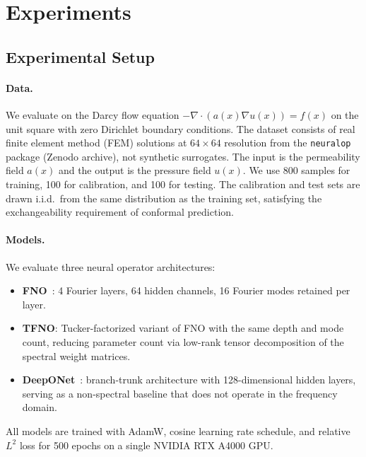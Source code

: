 
\section{Experiments}
\label{sec:experiments}

\subsection{Experimental Setup}
\label{subsec:setup}

\paragraph{Data.}
We evaluate on the Darcy flow equation $-\nabla \cdot (a(x)\nabla u(x)) = f(x)$ on the unit square with zero Dirichlet boundary conditions. The dataset consists of real finite element method (FEM) solutions at $64 \times 64$ resolution from the \texttt{neuralop} package (Zenodo archive), not synthetic surrogates. The input is the permeability field $a(x)$ and the output is the pressure field $u(x)$. We use 800 samples for training, 100 for calibration, and 100 for testing. The calibration and test sets are drawn i.i.d.\ from the same distribution as the training set, satisfying the exchangeability requirement of conformal prediction.

\paragraph{Models.}
We evaluate three neural operator architectures:
\begin{itemize}[leftmargin=*,itemsep=2pt,topsep=2pt]
  \item \textbf{FNO}~\citep{li2021fourier}: 4 Fourier layers, 64 hidden channels, 16 Fourier modes retained per layer.
  \item \textbf{TFNO}: Tucker-factorized variant of FNO with the same depth and mode count, reducing parameter count via low-rank tensor decomposition of the spectral weight matrices.
  \item \textbf{DeepONet}~\citep{lu2021learning}: branch-trunk architecture with 128-dimensional hidden layers, serving as a non-spectral baseline that does not operate in the frequency domain.
\end{itemize}
All models are trained with AdamW, cosine learning rate schedule, and relative $L^2$ loss for 500 epochs on a single NVIDIA RTX A4000 GPU.

